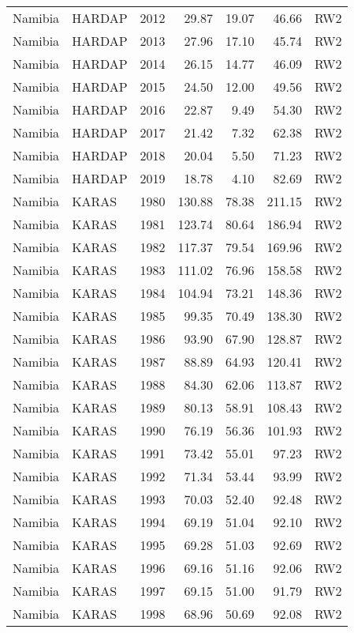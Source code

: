 \begin{longtable}{lllrrrl}
  Namibia & HARDAP & 2012 & 29.87 & 19.07 & 46.66 & RW2 \\ 
  Namibia & HARDAP & 2013 & 27.96 & 17.10 & 45.74 & RW2 \\ 
  Namibia & HARDAP & 2014 & 26.15 & 14.77 & 46.09 & RW2 \\ 
  Namibia & HARDAP & 2015 & 24.50 & 12.00 & 49.56 & RW2 \\ 
  Namibia & HARDAP & 2016 & 22.87 & 9.49 & 54.30 & RW2 \\ 
  Namibia & HARDAP & 2017 & 21.42 & 7.32 & 62.38 & RW2 \\ 
  Namibia & HARDAP & 2018 & 20.04 & 5.50 & 71.23 & RW2 \\ 
  Namibia & HARDAP & 2019 & 18.78 & 4.10 & 82.69 & RW2 \\ 
  Namibia & KARAS & 1980 & 130.88 & 78.38 & 211.15 & RW2 \\ 
  Namibia & KARAS & 1981 & 123.74 & 80.64 & 186.94 & RW2 \\ 
  Namibia & KARAS & 1982 & 117.37 & 79.54 & 169.96 & RW2 \\ 
  Namibia & KARAS & 1983 & 111.02 & 76.96 & 158.58 & RW2 \\ 
  Namibia & KARAS & 1984 & 104.94 & 73.21 & 148.36 & RW2 \\ 
  Namibia & KARAS & 1985 & 99.35 & 70.49 & 138.30 & RW2 \\ 
  Namibia & KARAS & 1986 & 93.90 & 67.90 & 128.87 & RW2 \\ 
  Namibia & KARAS & 1987 & 88.89 & 64.93 & 120.41 & RW2 \\ 
  Namibia & KARAS & 1988 & 84.30 & 62.06 & 113.87 & RW2 \\ 
  Namibia & KARAS & 1989 & 80.13 & 58.91 & 108.43 & RW2 \\ 
  Namibia & KARAS & 1990 & 76.19 & 56.36 & 101.93 & RW2 \\ 
  Namibia & KARAS & 1991 & 73.42 & 55.01 & 97.23 & RW2 \\ 
  Namibia & KARAS & 1992 & 71.34 & 53.44 & 93.99 & RW2 \\ 
  Namibia & KARAS & 1993 & 70.03 & 52.40 & 92.48 & RW2 \\ 
  Namibia & KARAS & 1994 & 69.19 & 51.04 & 92.10 & RW2 \\ 
  Namibia & KARAS & 1995 & 69.28 & 51.03 & 92.69 & RW2 \\ 
  Namibia & KARAS & 1996 & 69.16 & 51.16 & 92.06 & RW2 \\ 
  Namibia & KARAS & 1997 & 69.15 & 51.00 & 91.79 & RW2 \\ 
  Namibia & KARAS & 1998 & 68.96 & 50.69 & 92.08 & RW2 \\ 

\end{longtable}
